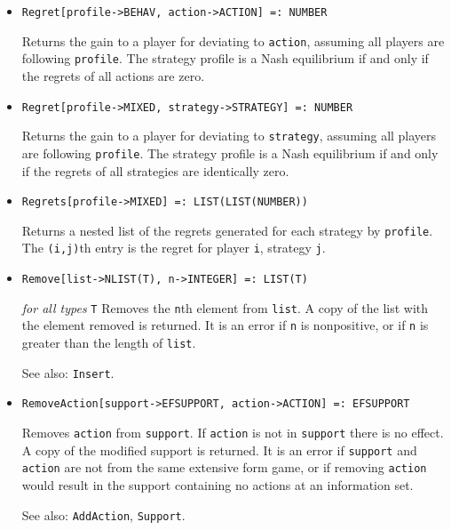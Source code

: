 \begin{itemize}
\item{}
\protect \large \begin{verbatim}
Regret[profile->BEHAV, action->ACTION] =: NUMBER 
\end{verbatim} \normalsize

\bd
Returns the gain to a player for deviating to \verb+action+, assuming
all players are following \verb+profile+.  The strategy profile is
a Nash equilibrium if and only if the regrets of all actions are zero.
\ed

\item{}
\protect \large \begin{verbatim}
Regret[profile->MIXED, strategy->STRATEGY] =: NUMBER 
\end{verbatim} \normalsize

\bd
Returns the gain to a player for deviating to \verb+strategy+, assuming
all players are following \verb+profile+.  The strategy profile is
a Nash equilibrium if and only if the regrets of all strategies are
identically zero.
\ed

\item{}
\protect \large \begin{verbatim}
Regrets[profile->MIXED] =: LIST(LIST(NUMBER)) 
\end{verbatim} \normalsize

\bd
Returns a nested list of the regrets generated for each strategy by
\verb+profile+.  The \verb+(i,j)+th entry is the regret for player
\verb+i+, strategy \verb+j+.
\ed

\item{}
\protect \large \begin{verbatim}
Remove[list->NLIST(T), n->INTEGER] =: LIST(T) 
\end{verbatim}\normalsize

{\it for all types} {\tt T}
\bd
Removes the \verb+n+th element from \verb+list+.  A copy of the list
with the element removed is returned.  It is an error if \verb+n+
is nonpositive, or if \verb+n+ is greater than the length of \verb+list+.
\item [See also:] \verb+Insert+.
\ed

\item{}
\protect \large \begin{verbatim}
RemoveAction[support->EFSUPPORT, action->ACTION] =: EFSUPPORT 
\end{verbatim}\normalsize
\bd
Removes \verb+action+ from \verb+support+.  If
\verb+action+ is not in \verb+support+ there is no
effect.  A copy of the modified support is returned.  It is an error
if \verb+support+ and \verb+action+ are not from the same extensive
form game, or if removing \verb+action+ would result in the support
containing no actions at an information set.
\item [See also:] \verb+AddAction+, \verb+Support+.
\ed


\end{itemize}
